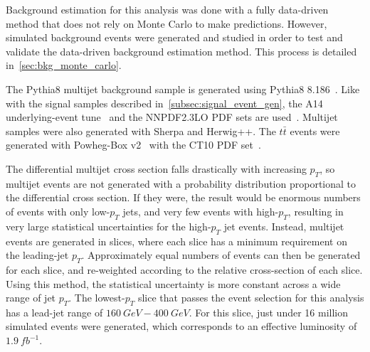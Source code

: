 Background estimation for this analysis was done with a fully data-driven method that does not rely on Monte Carlo to make predictions.
However, simulated background events were generated and studied in order to test and validate the data-driven background estimation method.
This process is detailed in~\ref{sec:bkg_monte_carlo}.

The Pythia8 multijet background sample is generated using Pythia8 8.186~\cite{signal-pythia}.
Like with the signal samples described in~\ref{subsec:signal_event_gen}, the A14 underlying-event tune~\cite{signal-pythia,signal-pythia-a14} and the NNPDF2.3LO PDF sets are used~\cite{signal-nnpdf}.
Multijet samples were also generated with Sherpa and Herwig++.
The $t\bar{t}$ events were generated with Powheg-Box v2~\cite{mc-powheg} with the CT10 PDF set~\cite{mc-ct10-pdf}.

The differential multijet cross section falls drastically with increasing $p_{T}$, so multijet events are not generated with a probability distribution proportional to the differential cross section.
If they were, the result would be enormous numbers of events with only low-$p_{T}$ jets, and very few events with high-$p_{T}$, resulting in very large statistical uncertainties for the high-$p_{T}$ jet events.
Instead, multijet events are generated in slices, where each slice has a minimum requirement on the leading-jet $p_{T}$.
Approximately equal numbers of events can then be generated for each slice, and re-weighted according to the relative cross-section of each slice.
Using this method, the statistical uncertainty is more constant across a wide range of jet $p_{T}$.
The lowest-$p_{T}$ slice that passes the event selection for this analysis has a lead-jet range of $160~GeV - 400~GeV$.
For this slice, just under 16 million simulated events were generated, which corresponds to an effective luminosity of $1.9~fb^{-1}$.